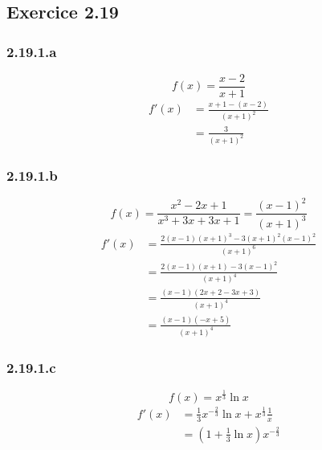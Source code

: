 \documentclass{report}
\begin{document}
\subsection*{Exercice 2.19}
\subsubsection*{2.19.1.a}
\begin{displaymath}
	f(x) = \frac{x-2}{x+1}
\end{displaymath}
\begin{equation*}
	\begin{split}
		f'(x) &=\frac{x+1 - (x-2)}{(x+1)^2}\\
		      &=\frac{3}{(x+1)^2}
	\end{split}	
\end{equation*}

\subsubsection*{2.19.1.b}
\begin{displaymath}
	f(x) = \frac{x^2-2x+1}{x^3+3x+3x+1} = \frac{(x-1)^2}{(x+1)^3}
\end{displaymath}
\begin{equation*}
	\begin{split}
		f'(x) &=\frac{2(x-1)(x+1)^3 - 3(x+1)^2(x-1)^2}{(x+1)^6}\\
		      &=\frac{2(x-1)(x+1) - 3(x-1)^2}{(x+1)^4} \\
		      &=\frac{(x-1)(2x+2-3x+3)}{(x+1)^4} \\
		      &=\frac{(x-1)(-x+5)}{(x+1)^4}
	\end{split}	
\end{equation*}

\subsubsection*{2.19.1.c}
\begin{displaymath}
	f(x) = x^{\frac{1}{3}} \ln x
\end{displaymath}
\begin{equation*}
	\begin{split}
		f'(x) &= \frac{1}{3} x^{-\frac{2}{3}} \ln x + x^{\frac{1}{3}} \frac{1}{x} \\
		      &=\left(1 + \frac{1}{3}\ln x \right) x^{-\frac{2}{3}}
	\end{split}	
\end{equation*}
\end{document}
